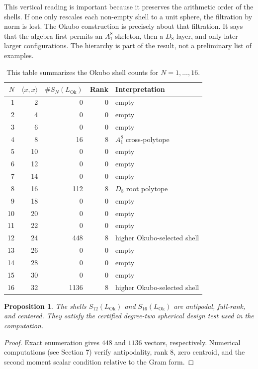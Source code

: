 \documentclass{birkjour}
\newtheorem{proposition}[theorem]{Proposition}
\newcommand{\LOk}{L_{\mathrm{Ok}}}
\numberwithin{equation}{section}
\begin{document}
This vertical reading is important because it preserves the arithmetic order
of the shells. If one only rescales each non-empty shell to a unit sphere, the
filtration by norm is lost. The Okubo construction is precisely about that
filtration. It says that the algebra first permits an \(A_1^8\) skeleton, then
a \(D_8\) layer, and only later larger configurations. The hierarchy is part
of the result, not a preliminary list of examples.

\begin{table}[htbp]
\centering
\small
\renewcommand{\arraystretch}{1.08}
\begin{tabular}{rrrrl}
\toprule
\(N\) & \(\langle x,x\rangle\) & \(\#S_N(\LOk)\) & Rank & Interpretation \\
\midrule
1 & 2 & 0 & 0 & empty \\
2 & 4 & 0 & 0 & empty \\
3 & 6 & 0 & 0 & empty \\
4 & 8 & 16 & 8 & \(A_1^8\) cross-polytope \\
5 & 10 & 0 & 0 & empty \\
6 & 12 & 0 & 0 & empty \\
7 & 14 & 0 & 0 & empty \\
8 & 16 & 112 & 8 & \(D_8\) root polytope \\
9 & 18 & 0 & 0 & empty \\
10 & 20 & 0 & 0 & empty \\
11 & 22 & 0 & 0 & empty \\
12 & 24 & 448 & 8 & higher Okubo-selected shell \\
13 & 26 & 0 & 0 & empty \\
14 & 28 & 0 & 0 & empty \\
15 & 30 & 0 & 0 & empty \\
16 & 32 & 1136 & 8 & higher Okubo-selected shell \\
\bottomrule
\end{tabular}
\caption{This table summarizes the Okubo shell counts for \(N=1,\ldots,16\).}
\label{tab:okubo-shells}
\end{table}

\begin{proposition}
The shells \(S_{12}(\LOk)\) and \(S_{16}(\LOk)\) are antipodal, full-rank, and
centered. They satisfy the certified degree-two spherical design test used in
the computation.
\end{proposition}

\begin{proof}
Exact enumeration gives \(448\) and \(1136\) vectors, respectively. Numerical computations (see Section 7) verify antipodality, rank \(8\), zero centroid, and the second
moment scalar condition relative to the Gram form.
\end{proof}
\end{document}
